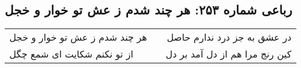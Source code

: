 \begin{center}
\section*{رباعی شماره ۲۵۳: هر چند شدم ز عش تو خوار و خجل}
\label{sec:sh253}
\begin{longtable}{l p{0.5cm} r}
هر چند شدم ز عش تو خوار و خجل
&&
در عشق به جز درد ندارم حاصل
\\
از تو نکنم شکایت ای شمع چگل
&&
کین رنج مرا هم از دل آمد بر دل
\\
\end{longtable}
\end{center}
